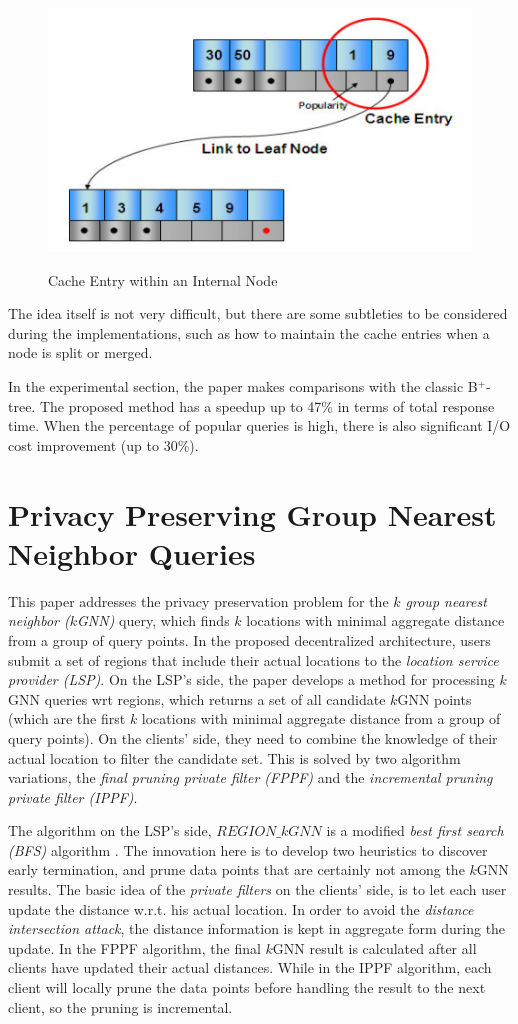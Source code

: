 \documentclass[paper=a4, fontsize=18pt]{article} %
\numberwithin{equation}{section} %
\numberwithin{figure}{section} %
\numberwithin{table}{section} %
\begin{document}
\begin{figure}[h]
  \centering
  \includegraphics[width=.6\linewidth]{4.png}\\
  \caption{Cache Entry within an Internal Node}\label{fig:entry_node}
\end{figure}

The idea itself is not very difficult, but there are some subtleties to be considered during the implementations, such as how to maintain the cache entries when a node is split or merged.

In the experimental section, the paper makes comparisons with the classic B$^+$-tree. The proposed method has a speedup up to 47\% in terms of total response time. When the percentage of popular queries is high, there is also significant I/O cost improvement (up to 30\%).

\section{Privacy Preserving Group Nearest Neighbor Queries \cite{HKZ10}}

This paper addresses the privacy preservation problem for the \emph{$k$ group nearest neighbor ($k$GNN)} query, which finds $k$ locations with minimal aggregate distance from a group of query points. In the proposed decentralized architecture, users submit a set of regions that include their actual locations to the \emph{location service provider (LSP)}. On the LSP's side, the paper develops a method for processing $k$GNN queries wrt regions, which returns a set of all candidate $k$GNN points (which are the first $k$ locations with minimal aggregate distance from a group of query points). On the clients' side, they need to combine the knowledge of their actual location to filter the candidate set. This is solved by two algorithm variations, the \emph{final pruning private filter (FPPF)} and the \emph{incremental pruning private filter (IPPF)}.

The algorithm on the LSP's side, $REGION\_kGNN$ is a modified \emph{best first search (BFS)} algorithm \cite{HS99}. The innovation here is to develop two heuristics to discover early termination, and prune data points that are certainly not among the $k$GNN results. The basic idea of the \emph{private filters} on the clients' side, is to let each user update the distance w.r.t. his actual location. In order to avoid the \emph{distance intersection attack}, the distance information is kept in aggregate form during the update. In the FPPF algorithm, the final $k$GNN result is calculated after all clients have updated their actual distances. While in the IPPF algorithm, each client will locally prune the data points before handling the result to the next client, so the pruning is incremental.
\end{document}
